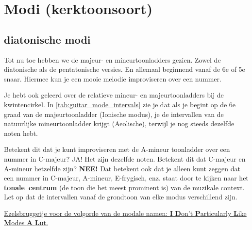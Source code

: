 \section{Modi (kerktoonsoort)} \label{sec:modes}

\subsection{diatonische modi}

Tot nu toe hebben we de majeur- en mineurtoonladders gezien. Zowel de diatonische als de pentatonische versies. En allemaal beginnend vanaf de 6e of 5e snaar. Hiermee kun je een mooie melodie improviseren over een nummer.

Je hebt ook geleerd over de relatieve mineur- en majeurtoonladders bij de kwintencirkel. In \autoref{tab:guitar_mode_intervals} zie je dat als je begint op de 6e graad van de majeurtoonladder (Ionische modus), je de intervallen van de natuurlijke mineurtoonladder krijgt (\textnormal{A}eolische), terwijl je nog steeds dezelfde noten hebt.

Betekent dit dat je kunt improviseren met de A-mineur toonladder over een nummer in C-majeur? JA! Het zijn dezelfde noten. Betekent dit dat C-majeur en A-mineur hetzelfde zijn? \textbf{NEE!} Dat betekent ook dat je alleen kunt zeggen dat een nummer in C-majeur, A-mineur, E-frygisch, enz. staat door te kijken naar het \mbox{\textbf{tonale centrum}} (de toon die het meest prominent is) van de muzikale context. Let op dat de intervallen vanaf de grondtoon van elke modus verschillend zijn.

\underline{Ezelsbruggetje voor de volgorde van de modale namen: \textbf{I} \textbf{D}on't \textbf{P}articularly \textbf{L}ike \textbf{M}odes \textbf{A} \textbf{Lo}t.} %

